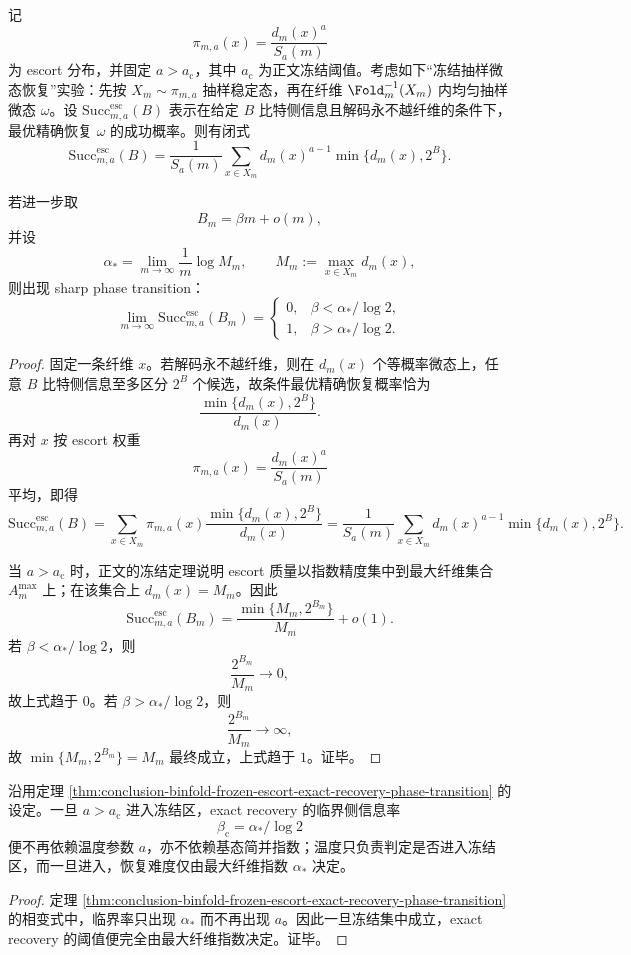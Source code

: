 \begin{theorem}\label{thm:conclusion-binfold-frozen-escort-exact-recovery-phase-transition}
记
\[
\pi_{m,a}(x)=\frac{d_m(x)^a}{S_a(m)}
\]
为 escort 分布，并固定 \(a>a_{\mathrm c}\)，其中 \(a_{\mathrm c}\) 为正文冻结阈值。考虑如下“冻结抽样微态恢复”实验：先按 \(X_m\sim \pi_{m,a}\) 抽样稳定态，再在纤维 \(\Fold_m^{-1}(X_m)\) 内均匀抽样微态 \(\omega\)。设 \(\mathrm{Succ}^{\mathrm{esc}}_{m,a}(B)\) 表示在给定 \(B\) 比特侧信息且解码永不越纤维的条件下，最优精确恢复 \(\omega\) 的成功概率。则有闭式
\[
\mathrm{Succ}^{\mathrm{esc}}_{m,a}(B)
=
\frac{1}{S_a(m)}
\sum_{x\in X_m}
d_m(x)^{a-1}\min\{d_m(x),2^B\}.
\]

若进一步取
\[
B_m=\beta m+o(m),
\]
并设
\[
\alpha_*=\lim_{m\to\infty}\frac{1}{m}\log M_m,
\qquad
M_m:=\max_{x\in X_m}d_m(x),
\]
则出现 sharp phase transition：
\[
\lim_{m\to\infty}\mathrm{Succ}^{\mathrm{esc}}_{m,a}(B_m)
=
\begin{cases}
0, & \beta<\alpha_*/\log 2,\\[1mm]
1, & \beta>\alpha_*/\log 2.
\end{cases}
\]
\end{theorem}

\begin{proof}
固定一条纤维 \(x\)。若解码永不越纤维，则在 \(d_m(x)\) 个等概率微态上，任意 \(B\) 比特侧信息至多区分 \(2^B\) 个候选，故条件最优精确恢复概率恰为
\[
\frac{\min\{d_m(x),2^B\}}{d_m(x)}.
\]
再对 \(x\) 按 escort 权重
\[
\pi_{m,a}(x)=\frac{d_m(x)^a}{S_a(m)}
\]
平均，即得
\[
\mathrm{Succ}^{\mathrm{esc}}_{m,a}(B)
=
\sum_{x\in X_m}\pi_{m,a}(x)\frac{\min\{d_m(x),2^B\}}{d_m(x)}
=
\frac{1}{S_a(m)}
\sum_{x\in X_m}d_m(x)^{a-1}\min\{d_m(x),2^B\}.
\]

当 \(a>a_{\mathrm c}\) 时，正文的冻结定理说明 escort 质量以指数精度集中到最大纤维集合 \(A_m^{\max}\) 上；在该集合上 \(d_m(x)=M_m\)。因此
\[
\mathrm{Succ}^{\mathrm{esc}}_{m,a}(B_m)
=
\frac{\min\{M_m,2^{B_m}\}}{M_m}+o(1).
\]
若 \(\beta<\alpha_*/\log 2\)，则
\[
\frac{2^{B_m}}{M_m}\to 0,
\]
故上式趋于 \(0\)。若 \(\beta>\alpha_*/\log 2\)，则
\[
\frac{2^{B_m}}{M_m}\to \infty,
\]
故 \(\min\{M_m,2^{B_m}\}=M_m\) 最终成立，上式趋于 \(1\)。证毕。
\end{proof}

\begin{corollary}[冻结区内的恢复阈值与温度无关]\label{cor:conclusion-binfold-frozen-escort-recovery-threshold-temperature-independent}
沿用定理 \ref{thm:conclusion-binfold-frozen-escort-exact-recovery-phase-transition} 的设定。一旦 \(a>a_{\mathrm c}\) 进入冻结区，exact recovery 的临界侧信息率
\[
\beta_{\mathrm c}=\alpha_*/\log 2
\]
便不再依赖温度参数 \(a\)，亦不依赖基态简并指数；温度只负责判定是否进入冻结区，而一旦进入，恢复难度仅由最大纤维指数 \(\alpha_*\) 决定。
\end{corollary}

\begin{proof}
定理 \ref{thm:conclusion-binfold-frozen-escort-exact-recovery-phase-transition} 的相变式中，临界率只出现 \(\alpha_*\) 而不再出现 \(a\)。因此一旦冻结集中成立，exact recovery 的阈值便完全由最大纤维指数决定。证毕。
\end{proof}
